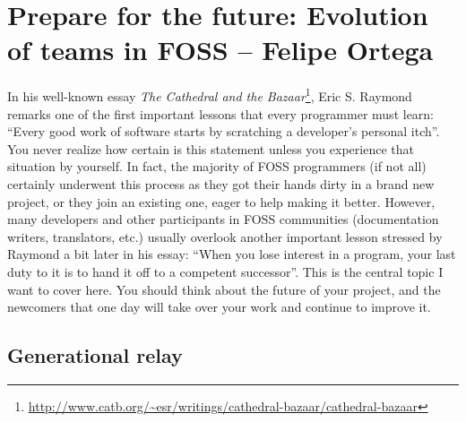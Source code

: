 \chapter{Prepare for the future: Evolution of teams in FOSS -- Felipe Ortega}
In his well-known essay \textit{The Cathedral and the Bazaar}\footnote{\url{http://www.catb.org/~esr/writings/cathedral-bazaar/cathedral-bazaar}}, Eric S. Raymond remarks one of the first important lessons that every programmer must learn: ``Every good work of software starts by scratching a developer's personal itch''. You never realize how certain is this statement unless you experience that situation by yourself. In fact, the majority of FOSS programmers (if not all) certainly underwent this process as they got their hands dirty in a brand new project, or they join an existing one, eager to help making it better.
However, many developers and other participants in FOSS communities (documentation writers, translators, etc.) usually overlook another important lesson stressed by Raymond a bit later in his essay: ``When you lose interest in a program, your last duty to it is to hand it off to a competent successor''. This is the central topic I want to cover here. You should think about the future of your project, and the newcomers that one day will take over your work and continue to improve it.

\section*{Generational relay}

